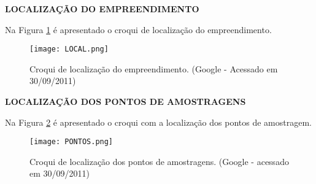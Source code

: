 
\newpage
\begin{SingleSpace}

\textbf{LOCALIZAÇÃO DO EMPREENDIMENTO}

Na Figura \ref{croqui_localizacao} é apresentado o croqui de localização do empreendimento.

\begin{figure}[!h]
\centering
\texttt{[image: LOCAL.png]}
\caption{Croqui de localização do empreendimento. (Google - Acessado em 30/09/2011)}
\label{croqui_localizacao}
\end{figure}


\textbf{LOCALIZAÇÃO DOS PONTOS DE AMOSTRAGENS}

Na Figura \ref{croqui_pontos} é apresentado o croqui com a localização dos pontos de amostragem.

\begin{figure}[!h]
\centering
\texttt{[image: PONTOS.png]}
\caption{Croqui de localização dos pontos de amostragens. (Google - acessado em 30/09/2011)}
\label{croqui_pontos}
\end{figure}
\end{SingleSpace}

